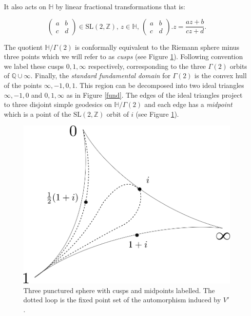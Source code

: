 \documentclass[12pt,a4paper]{amsart}
\def\HH{\mathbb{H}}
\def\xx{\HH/g2}
\def\ZZ{\mathbb{Z}}
\def\QQ{\mathbb{Q}}
\def\sl2{\mathrm{SL}(2, \ZZ)}
\def\g2{\Gamma(2)}
\def\xx{\HH/\g2}
\begin{document}
It also acts on $\HH$ by linear fractional transformations that is:

$$\begin{pmatrix}
a & b \\
c & d
\end{pmatrix} \in \sl2,\, z\in \HH,\, 
\begin{pmatrix}
a & b \\
c & d
\end{pmatrix}. z = \frac{az + b}{cz + d}.
$$

The quotient $\xx$ is conformally equivalent to the Riemann  sphere
minus three points which we will refer to as \textit{cusps} (see
Figure \ref{3punctured}). Following  convention we label these cusps
$0,1,\infty$ respectively, corresponding to the three $\g2$ orbits
of $\QQ \cup \infty$. Finally, the \textit{standard fundamental
domain}  for $\g2$ is the convex hull of the points $\infty, -1, 0 ,
1$. This region can be decomposed into two ideal triangles $\infty,
-1, 0 $ and $ 0 , 1,\infty$ as in Figure \ref{fund}. The edges of
the ideal triangles project to three disjoint simple geodesics on
$\xx$ and each edge has a \textit{midpoint} which is a point of the
$\sl2$ orbit of $i$ (see Figure \ref{3punctured}).




 \begin{figure}[hb]
\begin{center}
\includegraphics[scale=.5]{3sphere.png} 
\end{center}
\caption{Three punctured sphere with cusps and midpoints labelled.
The dotted loop is the fixed point set of the automorphism induced by $V'$.}
 \label{3punctured}
\end{figure}
\end{document}
